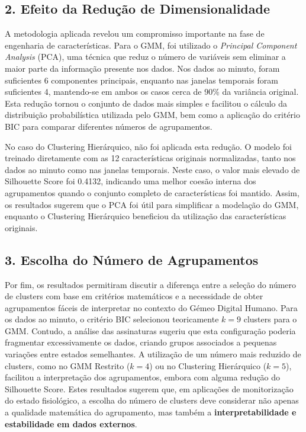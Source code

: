 \subsection*{2. Efeito da Redução de Dimensionalidade}

A metodologia aplicada revelou um compromisso importante na fase de engenharia de características. Para o GMM, foi utilizado o \textit{Principal Component Analysis} (PCA), uma técnica que reduz o número de variáveis sem eliminar a maior parte da informação presente nos dados. Nos dados ao minuto, foram suficientes 6 componentes principais, enquanto nas janelas temporais foram suficientes 4, mantendo-se em ambos os casos cerca de 90\% da variância original. Esta redução tornou o conjunto de dados mais simples e facilitou o cálculo da distribuição probabilística utilizada pelo GMM, bem como a aplicação do critério BIC para comparar diferentes números de agrupamentos.

No caso do Clustering Hierárquico, não foi aplicada esta redução. O modelo foi treinado diretamente com as 12 características originais normalizadas, tanto nos dados ao minuto como nas janelas temporais. Neste caso, o valor mais elevado de Silhouette Score foi 0.4132, indicando uma melhor coesão interna dos agrupamentos quando o conjunto completo de características foi mantido. Assim, os resultados sugerem que o PCA foi útil para simplificar a modelação do GMM, enquanto o Clustering Hierárquico beneficiou da utilização das características originais.

\subsection*{3. Escolha do Número de Agrupamentos}

Por fim, os resultados permitiram discutir a diferença entre a seleção do número de clusters com base em critérios matemáticos e a necessidade de obter agrupamentos fáceis de interpretar no contexto do Gémeo Digital Humano. Para os dados ao minuto, o critério BIC selecionou teoricamente $k=9$ clusters para o GMM. Contudo, a análise das assinaturas sugeriu que esta configuração poderia fragmentar excessivamente os dados, criando grupos associados a pequenas variações entre estados semelhantes. A utilização de um número mais reduzido de clusters, como no GMM Restrito ($k=4$) ou no Clustering Hierárquico ($k=5$), facilitou a interpretação dos agrupamentos, embora com alguma redução do Silhouette Score. Estes resultados sugerem que, em aplicações de monitorização do estado fisiológico, a escolha do número de clusters deve considerar não apenas a qualidade matemática do agrupamento, mas também a \textbf{interpretabilidade e estabilidade em dados externos}.


